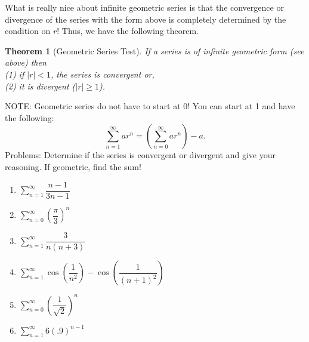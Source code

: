 \documentclass[10pt]{article}
\newcommand{\ds}{\displaystyle}
\theoremstyle{Theorem}
\newtheorem{theorem}{Theorem}[section]
\theoremstyle{definition}
\theoremstyle{remark}
\theoremstyle{custom}
\begin{document}
What is really nice about infinite geometric series is that the convergence or divergence of the series with the form above is completely determined by the condition on $r$! Thus, we have the following theorem.
\begin{theorem}[Geometric Series Test]
If a series is of infinite geometric form (see above) then\\
(1) if $|r|<1$, the series is convergent or,\\
(2) it is divergent ($|r|\geq 1$).
\end{theorem}
NOTE: Geometric series do not have to start at 0! You can start at 1 and have the following:
\[
\sum_{n=1}^{\infty}ar^n=\left(\sum_{n=0}^{\infty}ar^n\right)-a.
\]
\newpage
\noindent Problems: Determine if the series is convergent or divergent and give your reasoning. If geometric, find the sum!
\begin{enumerate}[1.]
\item $\ds \sum_{n=1}^{\infty} \dfrac{n-1}{3n-1}$
\item $\ds \sum_{n=0}^{\infty} \left(\dfrac{\pi}{3}\right)^n$
\item $\ds \sum_{n=1}^{\infty} \dfrac{3}{n(n+3)}$
\item $\ds \sum_{n=1}^{\infty}  \cos\left(\dfrac{1}{n^2}\right)-\cos\left(\dfrac{1}{(n+1)^2}\right)$
\item $\ds \sum_{n=0}^{\infty} \left( \dfrac{1}{\sqrt{2}}\right)^n$
\item $\ds \sum_{n=1}^{\infty} 6(.9)^{n-1}$
\end{enumerate}
\end{document}
